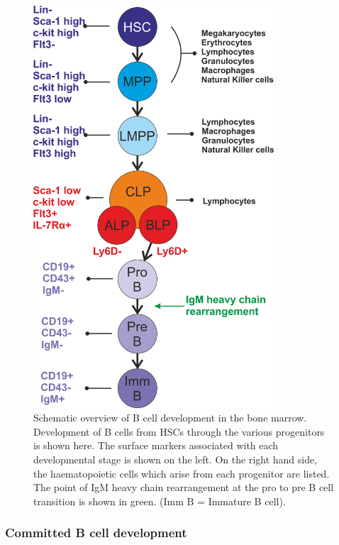 \begin{figure}
\centering
\includegraphics[width=0.8\textwidth]{Figures/Bcelldevdiagram.png}
\caption[Schematic overview of B cell development in the bone marrow]{Schematic overview of B cell development in the bone marrow. Development of B cells from HSCs through the various progenitors is shown here. The surface markers associated with each developmental stage is shown on the left. On the right hand side, the haematopoietic cells which arise from each progenitor are listed.
The point of IgM heavy chain rearrangement at the pro to pre B cell transition is shown in green. (Imm B = Immature B cell).}
\label{Bcelldev}
\end{figure}


\subsubsection{Committed B cell development}
\label{subsubsec:committedBcelldevelopment}

